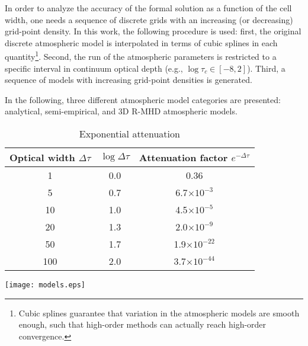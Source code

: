 \documentclass[iop,numberedappendix,twocolappendix,twocolumn]{emulateapj}
\begin{document}
In order to analyze the accuracy of the formal solution as a function of the cell width,
one needs a sequence of discrete grids with an increasing (or decreasing) grid-point density.
In this work, the following procedure is used:
first, the original discrete atmospheric model is interpolated in terms of cubic splines in each quantity\footnote{
Cubic splines guarantee that variation in the atmospheric models are smooth enough, such that high-order methods can actually reach high-order convergence.}.
Second, the run of the atmospheric parameters is restricted to a specific interval in continuum optical depth (e.g., $\log\tau_c\in[-8,2]$).
Third, a sequence of models with increasing grid-point densities is generated. 

In the following, three different atmospheric model categories are presented: analytical, semi-empirical, and 3D R-MHD atmospheric models.
%
\begin{table}
\caption{Exponential attenuation}
\setlength{\tabcolsep}{5pt}\renewcommand{\arraystretch}{1.5}
\centering
\begin{tabular}{|c|c|c|}\hline%
Optical width $\Delta \tau$	& $\log \Delta \tau$	& Attenuation factor $e^{-\Delta \tau}$\\
\hline %
1	& 0.0	& 0.36 \\
5	& 0.7	& 6.7$\times 10^{-3}$ \\
10	& 1.0	& 4.5$\times 10^{-5}$ \\
20	& 1.3	& 2.0$\times 10^{-9}$ \\
50	& 1.7	& 1.9$\times 10^{-22}$ \\
100	& 2.0	& 3.7$\times 10^{-44}$\\\hline
\end{tabular}
\label{tab:attenuation}
\end{table}\vspace*{0.2cm}
%
%
%
\begin{figure*}
\centering
\texttt{[image: models.eps]}
\caption{Temperature (top row), upward directed line of sight velocity (middle row), three components of the magnetic field (bottom row), all as a function of the geometrical height in the atmosphere.
Considered atmospheric models: first column FALC (solid), FALF (dotted);  second column Bifrost-1 (solid), Bifrost-2 (dotted); third column  CO$^5$BOLD-1 (solid),  CO$^5$BOLD-2 (dotted).
Note that Bifrost-1, Bifrost-2, CO$^5$BOLD-1, and CO$^5$BOLD-2 are single columns of time instants of 3D R-MHD simulations.}
\label{fig:models}
\end{figure*}
%
\end{document}
